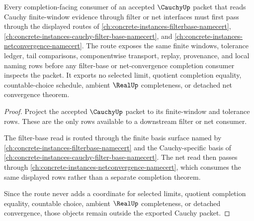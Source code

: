 \begin{theorem}
\label{thm:cauchy-filterbase-netconvergence-route}
Every completion-facing consumer of an accepted $\CauchyUp$ packet that reads Cauchy finite-window evidence through filter or net interfaces must first pass through the displayed routes of \autoref{ch:concrete-instances-filterbase-namecert}, \autoref{ch:concrete-instances-cauchy-filter-base-namecert}, and \autoref{ch:concrete-instances-netconvergence-namecert}. The route exposes the same finite windows, tolerance ledger, tail comparisons, componentwise transport, replay, provenance, and local naming rows before any filter-base or net-convergence completion consumer inspects the packet. It exports no selected limit, quotient completion equality, countable-choice schedule, ambient $\RealUp$ completeness, or detached net convergence theorem.
\end{theorem}
\begin{proof}
Project the accepted $\CauchyUp$ packet to its finite-window and tolerance rows. These are the only rows available to a downstream filter or net consumer.

The filter-base read is routed through the finite basis surface named by \autoref{ch:concrete-instances-filterbase-namecert} and the Cauchy-specific basis of \autoref{ch:concrete-instances-cauchy-filter-base-namecert}. The net read then passes through \autoref{ch:concrete-instances-netconvergence-namecert}, which consumes the same displayed rows rather than a separate completion theorem.

Since the route never adds a coordinate for selected limits, quotient completion equality, countable choice, ambient $\RealUp$ completeness, or detached convergence, those objects remain outside the exported Cauchy packet.
\end{proof}
